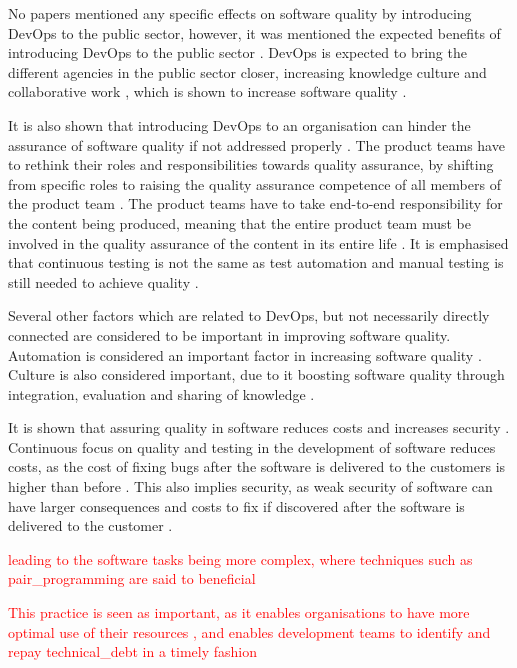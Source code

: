 No papers mentioned any specific effects on software quality by introducing DevOps to the public sector, however, it was mentioned the expected benefits of introducing DevOps to the public sector \cite{mm_2021}. DevOps is expected to bring the different agencies in the public sector closer, increasing knowledge culture and collaborative work \cite{mm_2021}, which is shown to increase software quality \cite{smm_2018}.

It is also shown that introducing DevOps to an organisation can hinder the assurance of software quality if not addressed properly \cite{dsc_2019}. The product teams have to rethink their roles and responsibilities towards quality assurance, by shifting from specific roles to raising the quality assurance competence of all members of the product team \cite{dsc_2019}. The product teams have to take end-to-end responsibility for the content being produced, meaning that the entire product team must be involved in the quality assurance of the content in its entire life \cite{dsc_2019}. It is emphasised that continuous testing is not the same as test automation and manual testing is still needed to achieve quality \cite{dsc_2019}.

Several other factors which are related to DevOps, but not necessarily directly connected are considered to be important in improving software quality. Automation is considered an important factor in increasing software quality \cite{smm_2018}. Culture is also considered important, due to it boosting software quality through integration, evaluation and sharing of knowledge \cite{smm_2018}.

It is shown that assuring quality in software reduces costs and increases security \cite{csw_2011}. Continuous focus on quality and testing in the development of software reduces costs, as the cost of fixing bugs after the software is delivered to the customers is higher than before \cite{csw_2011}. This also implies security, as weak security of software can have larger consequences and costs to fix if discovered after the software is delivered to the customer \cite{csw_2011}. 

\textcolor{red}{leading to the software tasks being more complex, where techniques such as \gls{pair_programming} are said to beneficial \cite{jeh_2009}}

\textcolor{red}{This practice is seen as important, as it enables organisations to have more optimal use of their resources \cite{mv_2022}, and enables development teams to identify and repay \gls{technical_debt} in a timely fashion \cite{mv_2022}}

